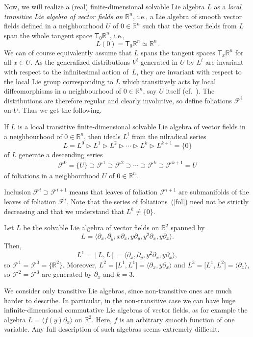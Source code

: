 Now, we will realize a (real) finite-dimensional solvable Lie algebra $L$ as a \emph{local transitive Lie algebra of vector fields on ${\mathbb R}^n$}, i.e., a Lie algebra of smooth vector fields defined in a neighbourhood $U$ of $0\in{\mathbb R}^n$ such that the vector fields from $L$ span the whole tangent space ${\mathsf T}_0{\mathbb R}^n$, i.e.,
\[ L(0)={\mathsf T}_0{\mathbb R}^n\simeq{\mathbb R}^n .\]
We can of course equivalently assume that $L$ spans the tangent spaces ${\mathsf T}_x{\mathbb R}^n$ for all $x\in U$.
As the generalized distributions $V^i$ generated in $U$ by $L^i$ are invariant with respect to the infinitesimal action of~$L$, they are invariant with respect to the local Lie group corresponding to $L$ which transitively acts by local diffeomorphisms in a neighbourhood of $0\in{\mathbb R}^n$, say $U$ itself (cf.~\cite{Palais}). The distributions are therefore regular and clearly involutive, so define foliations ${\mathcal F}^i$ on $U$. Thus we get the following.

\begin{Proposition}
If $L$ is a local transitive finite-dimensional solvable Lie algebra of vector fields in a neighbourhood of $0\in{\mathbb R}^n$, then ideals $L^i$ from the nilradical series
\[ L=L^0\vartriangleright L^1\vartriangleright L^2\vartriangleright\cdots\vartriangleright L^k\vartriangleright L^{k+1}=\{ 0\}\]
of $L$ generate a descending series
\begin{gather}\label{fol}{\mathcal F}^0=\{ U\}\supset{\mathcal F}^1\supset{\mathcal F}^2\supset \cdots\supset {\mathcal F}^{k}\supset {\mathcal F}^{k+1}=U \end{gather}
of foliations in a neighbourhood $U$ of $0\in{\mathbb R}^n$.
\end{Proposition}

Inclusion ${\mathcal F}^i\supset{\mathcal F}^{i+1}$ means that leaves of foliation ${\mathcal F}^{i+1}$ are submanifolds of the leaves of foliation ${\mathcal F}^{i}$. Note that the series of foliations~(\ref{fol}) need not be strictly decreasing and that we understand that $L^k\ne\{ 0\}$.
\begin{Example}\label{ex2}
Let $L$ be the solvable Lie algebra of vector fields on ${\mathbb R}^2$ spanned by
\[ L=\big\langle \partial_x ,\partial_y ,x\partial_x ,y\partial_y ,y^2\partial_x ,y\partial_x\big\rangle .\]
Then,
\[ L^1=[L,L]=\big\langle \partial_x ,\partial_y ,y^2\partial_x ,y\partial_x\big\rangle ,\]
so ${\mathcal F}^1={\mathcal F}^0=\big\{{\mathbb R}^2\big\}$. Moreover, $L^2=\big[L^1,L^1\big]=\langle\partial_x ,y\partial_x\rangle$ and $L^3=\big[L^1,L^2\big]=\langle\partial_x\rangle$, so ${\mathcal F}^2={\mathcal F}^3$ are generated by $\partial_x$ and $k=3$.
\end{Example}
\begin{Remark}We consider only transitive Lie algebras, since non-transitive ones are much harder to describe. In particular, in the non-transitive case we can have huge infinite-dimensional commutative Lie algebras of vector fields, as for example
the algebra $L=\langle f(y)\partial_x\rangle$ on ${\mathbb R}^2$. Here, $f$ is an arbitrary smooth function of one variable.
Any full description of such algebras seems extremely difficult.
\end{Remark}

